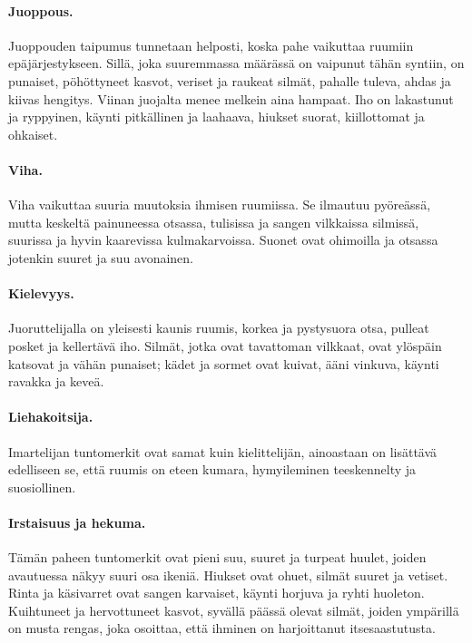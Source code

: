\documentclass[11pt, twoside, finnish, a5paper]{book}
\begin{document}
\paragraph{Juoppous.}
Juoppouden taipumus tunnetaan helposti, koska pahe
vaikuttaa ruumiin epäjärjestykseen. Sillä, joka
suuremmassa määrässä on vaipunut tähän syntiin, on punaiset,
pöhöttyneet kasvot, veriset ja raukeat silmät, pahalle
tuleva, ahdas ja kiivas hengitys. Viinan juojalta menee
melkein aina hampaat. Iho on lakastunut ja ryppyinen,
käynti  pitkällinen ja laahaava, hiukset suorat,
kiillottomat ja ohkaiset.

\paragraph{Viha.}
Viha vaikuttaa suuria muutoksia ihmisen ruumiissa.
Se ilmautuu pyöreässä, mutta keskeltä painuneessa
otsassa, tulisissa ja sangen vilkkaissa silmissä, suurissa
ja hyvin kaarevissa kulmakarvoissa.
Suonet ovat ohimoilla ja otsassa jotenkin suuret ja suu avonainen.

\paragraph{Kielevyys.}
Juoruttelijalla on yleisesti kaunis ruumis, korkea ja
pystysuora otsa, pulleat posket ja kellertävä iho. Silmät,
jotka ovat tavattoman vilkkaat, ovat ylöspäin katsovat
ja vähän punaiset; kädet ja sormet ovat kuivat, ääni
vinkuva, käynti ravakka ja keveä.

\paragraph{Liehakoitsija.}
Imartelijan tuntomerkit ovat samat kuin kielittelijän,
ainoastaan on lisättävä edelliseen se, että ruumis on
eteen kumara, hymyileminen teeskennelty ja suosiollinen.

\paragraph{Irstaisuus ja hekuma.}
Tämän paheen tuntomerkit ovat pieni suu, suuret ja
turpeat huulet, joiden avautuessa näkyy suuri osa ikeniä.
Hiukset ovat ohuet, silmät suuret ja vetiset. Rinta ja käsivarret
ovat sangen karvaiset, käynti horjuva ja ryhti huoleton.
Kuihtuneet ja hervottuneet kasvot, syvällä päässä
olevat silmät, joiden ympärillä on musta rengas, joka
osoittaa, että ihminen on harjoittanut itsesaastutusta.
\end{document}
